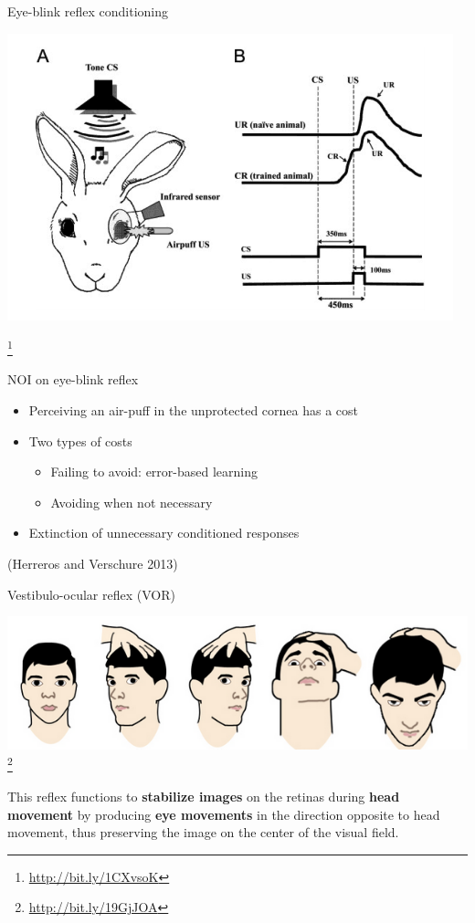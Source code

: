 \documentclass[ignorenonframetext,]{beamer}
\begin{document}
\begin{frame}{Eye-blink reflex conditioning}

\includegraphics{images/eyeblink.png}

\footnote{\url{http://bit.ly/1CXvsoK}}

\end{frame}

\begin{frame}{NOI on eye-blink reflex}

\begin{itemize}
\itemsep1pt\parskip0pt
\item
  Perceiving an air-puff in the unprotected cornea has a cost
\item
  Two types of costs

  \begin{itemize}
  \itemsep1pt\parskip0pt
  \item
    Failing to avoid: error-based learning
  \item
    Avoiding when not necessary
  \end{itemize}
\item
  Extinction of unnecessary conditioned responses
\end{itemize}

(Herreros and Verschure 2013)

\end{frame}

\begin{frame}{Vestibulo-ocular reflex (VOR)}

\includegraphics{images/vor.png}\footnote{\url{http://bit.ly/19GjJOA}}

This reflex functions to \textbf{stabilize images} on the retinas during
\textbf{head movement} by producing \textbf{eye movements} in the
direction opposite to head movement, thus preserving the image on the
center of the visual field.

\end{frame}
\end{document}
